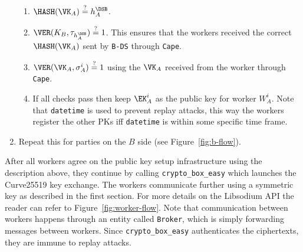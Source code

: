 \begin{enumerate}
  \begin{enumerate}
    \item $\HASH(\VK_A) \stackrel{?}{=} h_A^\DSB$.
    \item $\VER(K_B, \tau_{h_A^\DSB}) \stackrel{?}{=} 1$. This ensures that the workers
    received the correct $\HASH(\VK_A)$ sent by \verb|B-DS| through \verb|Cape|.
    \item $\VER(\VK_A, \sigma^i_A) \stackrel{?}{=} 1$
    using the $\VK_A$ received from the worker through \verb|Cape|.
    \item If all checks pass then keep $\EK_A^i$ as the public key for worker $W_A^i$.
    Note that \verb|datetime| is used to prevent replay attacks, this way the workers
    register the other PKs iff \verb|datetime| is within some specific time frame.
  \end{enumerate}

  \item Repeat this for parties on the $B$ side (see Figure~\ref{fig:b-flow}).
\end{enumerate}

After all workers agree on the public key setup infrastructure
using the description above, they continue by calling \verb|crypto_box_easy|
which launches the Curve25519 key exchange. The workers communicate further using a
symmetric key as described in the first section. For more details on the Libsodium API
the reader can refer to Figure~\ref{fig:worker-flow}. Note that communication
between workers happens through an entity called \verb|Broker|, which is
simply forwarding messages between workers. Since \verb|crypto_box_easy| authenticates 
the ciphertexts, they are immune to replay attacks.




